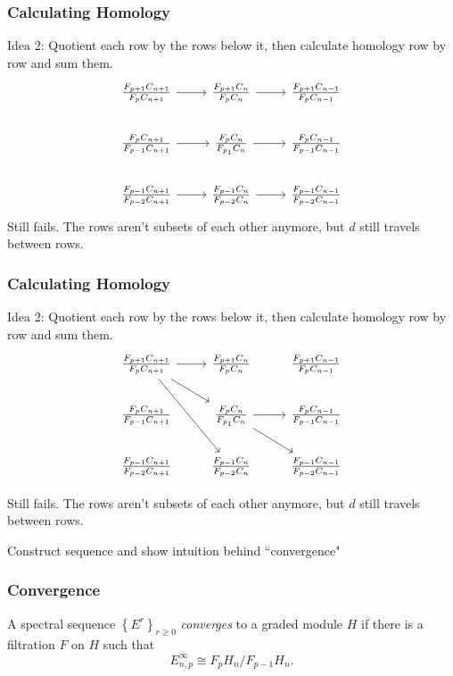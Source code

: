 \documentclass{beamer}
\begin{document}
\begin{frame}[fragile]
	\frametitle{Calculating Homology}

	Idea 2: Quotient each row by the rows below it, then calculate homology row by row and sum them.
	\[
	\begin{tikzcd}
		\frac{F_{p+1}C_{n+1}}{F_{p}C_{n+1}}\rar&\frac{F_{p+1}C_{n}}{F_{p}C_{n}}\rar&\frac{F_{p+1}C_{n-1}}{F_{p}C_{n-1}}\\
		\frac{F_{p}C_{n+1}}{F_{p-1}C_{n+1}}\rar&\frac{F_{p}C_{n}}{F_{p_1}C_{n}}\rar&\frac{F_{p}C_{n-1}}{F_{p-1}C_{n-1}}\\
		\frac{F_{p-1}C_{n+1}}{F_{p-2}C_{n+1}}\rar&\frac{F_{p-1}C_{n}}{F_{p-2}C_{n}}\rar&\frac{F_{p-1}C_{n-1}}{F_{p-2}C_{n-1}}
        \end{tikzcd}
	\] 
	{\color{white}Still fails. The rows aren't subsets of each other anymore, but $d$ still travels between rows.}
\end{frame}

\begin{frame}[fragile]
	\frametitle{Calculating Homology}

	Idea 2: Quotient each row by the rows below it, then calculate homology row by row and sum them.
	\[
		\begin{tikzcd}
			\frac{F_{p+1}C_{n+1}}{F_{p}C_{n+1}}\rar\arrow[rd]\arrow[rdd]&\frac{F_{p+1}C_{n}}{F_{p}C_{n}}&\frac{F_{p+1}C_{n-1}}{F_{p}C_{n-1}}\\
			\frac{F_{p}C_{n+1}}{F_{p-1}C_{n+1}}&\frac{F_{p}C_{n}}{F_{p_1}C_{n}}\rar\arrow[rd]&\frac{F_{p}C_{n-1}}{F_{p-1}C_{n-1}}\\
			\frac{F_{p-1}C_{n+1}}{F_{p-2}C_{n+1}}&\frac{F_{p-1}C_{n}}{F_{p-2}C_{n}}&\frac{F_{p-1}C_{n-1}}{F_{p-2}C_{n-1}}
		\end{tikzcd}
        \]

	Still fails. The rows aren't subsets of each other anymore, but $d$ still travels between rows.
\end{frame}

\begin{frame}
	{\color{red}Construct sequence and show intuition behind ``convergence"}
\end{frame}


\begin{frame}
	\frametitle{Convergence}

	\begin{definition}
		A spectral sequence $\left\{ E^{r} \right\}_{r \geq 0}$ \textit{converges} to a graded module $H$ if there is a filtration $F$ on $H$ such that
		\[
		E^{\infty}_{n,p} \cong F_{p}H_{n}/F_{p-1}H_{n}.
		\] 
	\end{definition}
\end{frame}
\end{document}
